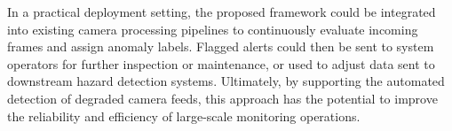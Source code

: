 \documentclass[remotesensing,article,submit,moreauthors]{Definitions/mdpi}
\begin{document}
In a practical deployment setting, the proposed framework could be integrated into existing camera processing pipelines to continuously evaluate incoming frames and assign anomaly labels. Flagged alerts could then be sent to system operators for further inspection or maintenance, or used to adjust data sent to downstream hazard detection systems. Ultimately, by supporting the automated detection of degraded camera feeds, this approach has the potential to improve the reliability and efficiency of large-scale monitoring operations.

\vspace{6pt} 




\end{document}
